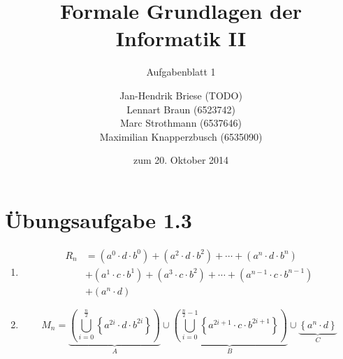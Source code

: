 \documentclass[a4paper]{scrartcl}
\title{Formale Grundlagen der Informatik II}
\subtitle{Aufgabenblatt 1}
\author{
    Jan-Hendrik Briese (TODO) \\
    Lennart Braun (6523742) \\
    Marc Strothmann (6537646) \\
    Maximilian Knapperzbusch (6535090)
}
\date{zum 20. Oktober 2014}
\begin{document}
\maketitle

\section*{Übungsaufgabe 1.3}
\begin{enumerate}
    \item
        \begin{equation}
            \label{equ:13r}
            \begin{split}
                R_n &= (a^0 \cdot d \cdot b^0) + (a^2 \cdot d \cdot b^2) + \cdots + (a^n \cdot d \cdot b^n) \\
                  &+ (a^1 \cdot c \cdot b^1) + (a^3 \cdot c \cdot b^2) + \cdots + (a^{n-1} \cdot c \cdot b^{n-1}) \\
                  &+ (a^n \cdot d)
            \end{split}
        \end{equation}
        
    \item
        \begin{equation}
            M_n = \underbrace{\left( \bigcup_{i=0}^{\frac{n}{2}} \left\{ a^{2i} \cdot d \cdot b^{2i} \right\} \right)}_A
            \cup \underbrace{\left( \bigcup_{i=0}^{\frac{n}{2}-1} \left\{ a^{2i+1} \cdot c \cdot b^{2i+1} \right\} \right)}_B
            \cup \underbrace{\left\{ a^n \cdot d \right\}}_C
        \end{equation}
        

\end{enumerate}
\end{document}
